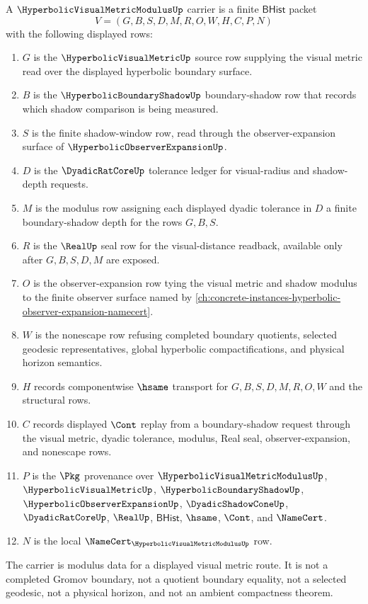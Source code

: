 \begin{definition}
\label{def:hyperbolic-visual-metric-modulus-carrier}
A $\HyperbolicVisualMetricModulusUp$ carrier is a finite $\mathsf{BHist}$ packet
$$
V=(G,B,S,D,M,R,O,W,H,C,P,N)
$$
with the following displayed rows:
\begin{enumerate}
\item $G$ is the $\HyperbolicVisualMetricUp$ source row supplying the visual metric read over the displayed hyperbolic boundary surface.
\item $B$ is the $\HyperbolicBoundaryShadowUp$ boundary-shadow row that records which shadow comparison is being measured.
\item $S$ is the finite shadow-window row, read through the observer-expansion surface of $\HyperbolicObserverExpansionUp$.
\item $D$ is the $\DyadicRatCoreUp$ tolerance ledger for visual-radius and shadow-depth requests.
\item $M$ is the modulus row assigning each displayed dyadic tolerance in $D$ a finite boundary-shadow depth for the rows $G,B,S$.
\item $R$ is the $\RealUp$ seal row for the visual-distance readback, available only after $G,B,S,D,M$ are exposed.
\item $O$ is the observer-expansion row tying the visual metric and shadow modulus to the finite observer surface named by \autoref{ch:concrete-instances-hyperbolic-observer-expansion-namecert}.
\item $W$ is the nonescape row refusing completed boundary quotients, selected geodesic representatives, global hyperbolic compactifications, and physical horizon semantics.
\item $H$ records componentwise $\hsame$ transport for $G,B,S,D,M,R,O,W$ and the structural rows.
\item $C$ records displayed $\Cont$ replay from a boundary-shadow request through the visual metric, dyadic tolerance, modulus, Real seal, observer-expansion, and nonescape rows.
\item $P$ is the $\Pkg$ provenance over $\HyperbolicVisualMetricModulusUp$, $\HyperbolicVisualMetricUp$, $\HyperbolicBoundaryShadowUp$, $\HyperbolicObserverExpansionUp$, $\DyadicShadowConeUp$, $\DyadicRatCoreUp$, $\RealUp$, $\mathsf{BHist}$, $\hsame$, $\Cont$, and $\NameCert$.
\item $N$ is the local $\NameCert_{\HyperbolicVisualMetricModulusUp}$ row.
\end{enumerate}
The carrier is modulus data for a displayed visual metric route. It is not a completed Gromov boundary, not a quotient boundary equality, not a selected geodesic, not a physical horizon, and not an ambient compactness theorem.
\end{definition}


